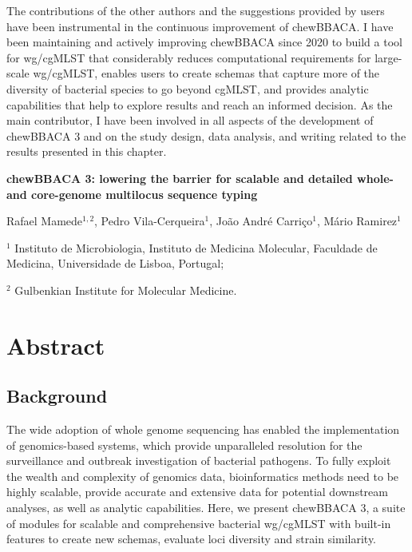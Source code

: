 The contributions of the other authors and the suggestions provided by users have been instrumental in the continuous improvement of chewBBACA. I have been maintaining and actively improving chewBBACA since 2020 to build a tool for \ac{wg/cgMLST} that considerably reduces computational requirements for large-scale \ac{wg/cgMLST}, enables users to create schemas that capture more of the diversity of bacterial species to go beyond \ac{cgMLST}, and provides analytic capabilities that help to explore results and reach an informed decision. As the main contributor, I have been involved in all aspects of the development of chewBBACA 3 and on the study design, data analysis, and writing related to the results presented in this chapter.

\newpage

\begin{center}
\large
\textbf{chewBBACA 3: lowering the barrier for scalable and detailed whole- and core-genome multilocus sequence typing}
\end{center}

Rafael Mamede$^{1,2}$, 
Pedro Vila-Cerqueira$^{1}$,
João André Carriço$^{1}$,
Mário Ramirez$^{1}$

$^1$ Instituto de Microbiologia, Instituto de Medicina Molecular, Faculdade de Medicina, Universidade de Lisboa, Portugal;

$^2$ Gulbenkian Institute for Molecular Medicine.

\section{Abstract} \label{sec:ch2_abstract}

\subsection{Background} \label{ssec:ch2_abstract_background}

The wide adoption of whole genome sequencing has enabled the implementation of genomics-based systems, which provide unparalleled resolution for the surveillance and outbreak investigation of bacterial pathogens. To fully exploit the wealth and complexity of genomics data, bioinformatics methods need to be highly scalable, provide accurate and extensive data for potential downstream analyses, as well as analytic capabilities. Here, we present chewBBACA 3, a suite of modules for scalable and comprehensive bacterial \ac{wg/cgMLST} with built-in features to create new schemas, evaluate loci diversity and strain similarity.


